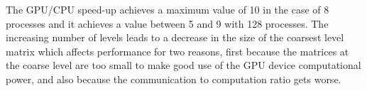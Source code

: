 The GPU/CPU speed-up achieves a maximum value of 10 in the case of 8
processes and it achieves a value between  5 and 9  with 128
processes. The  increasing number of levels leads to a decrease in
the size of the coarsest level matrix which affects performance for
two reasons, first because the matrices at the coarse level are too
small to make good use of the GPU device computational power, and also
because the communication to computation ratio gets worse.




